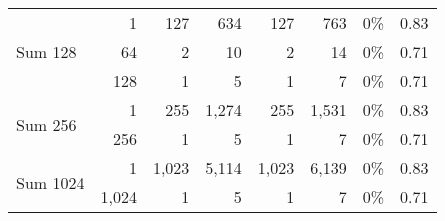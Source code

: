 \begin{table}
{\begin{tabular}{l||r||rr||rr||rr}
\multirow{3}{*}{Sum 128}      & 1                                        & 127                                                                    & 634                                                                        & 127                                                                    & 763                                                                        & 0\%                     & 0.83                    \\
                              & 64                                       & 2                                                                      & 10                                                                         & 2                                                                      & 14                                                                         & 0\%                     & 0.71                    \\
                              & 128                                      & 1                                                                      & 5                                                                          & 1                                                                      & 7                                                                          & 0\%                     & 0.71                    \\ \hline
\multirow{2}{*}{Sum 256}      & 1                                        & 255                                                                    & 1,274                                                                      & 255                                                                    & 1,531                                                                      & 0\%                     & 0.83                    \\
                              & 256                                      & 1                                                                      & 5                                                                          & 1                                                                      & 7                                                                          & 0\%                     & 0.71                    \\ \hline
\multirow{2}{*}{Sum 1024}     & 1                                        & 1,023                                                                  & 5,114                                                                      & 1,023                                                                  & 6,139                                                                      & 0\%                     & 0.83                    \\
                              & 1,024                                    & 1                                                                      & 5                                                                          & 1                                                                      & 7                                                                          & 0\%                     & 0.71
\end{tabular}%
}
\end{table}
